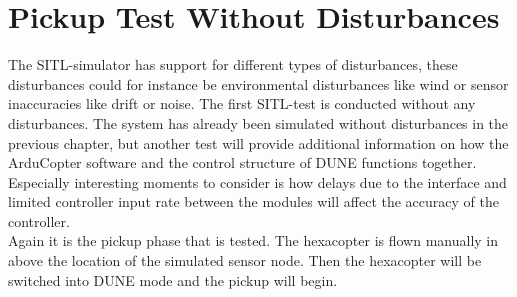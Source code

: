 \section{Pickup Test Without Disturbances}
The SITL-simulator has support for different types of disturbances, these disturbances could for instance be environmental disturbances like wind or sensor inaccuracies like drift or noise. The first SITL-test is conducted without any disturbances. The system has already been  simulated without disturbances in the previous chapter, but another test will provide additional information on how the ArduCopter software and the control structure of DUNE functions together. Especially interesting moments to consider is how delays due to the interface and limited controller input rate between the modules will affect the accuracy of the controller.\\
\newline
Again it is the pickup phase that is tested. The hexacopter is flown manually in above the location of the simulated sensor node. Then the hexacopter will be switched into DUNE mode and the pickup will begin.
